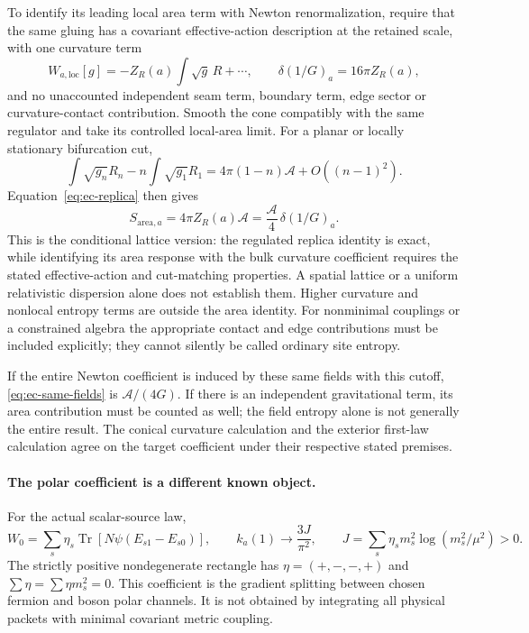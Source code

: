 \documentclass[10pt]{article}
\newcommand{\Tr}{\operatorname{Tr}}
\begin{document}
To identify its leading local area term with Newton renormalization,
require that the same gluing has a covariant effective-action
description at the retained scale, with one curvature term
\[
 W_{a,\mathrm{loc}}[g]=-Z_R(a)\int\sqrt g\,R+\cdots,
 \qquad \delta(1/G)_a=16\pi Z_R(a),
\]
and no unaccounted independent seam term, boundary term, edge sector
or curvature-contact contribution. Smooth the cone compatibly with
the same regulator and take its controlled local-area limit.
For a planar or locally stationary bifurcation cut,
\[
 \int\sqrt{g_n}R_n-n\int\sqrt{g_1}R_1
        =4\pi(1-n)\mathcal A+O((n-1)^2).
\]
Equation~\eqref{eq:ec-replica} then gives
\begin{equation}
 S_{\mathrm{area},a}=4\pi Z_R(a)\mathcal A
       =\frac{\mathcal A}{4}\,\delta(1/G)_a.
 \label{eq:ec-same-fields}
\end{equation}
This is the conditional lattice version: the regulated replica
identity is exact, while identifying its area response with the
bulk curvature coefficient requires the stated effective-action
and cut-matching properties. A spatial lattice or a uniform
relativistic dispersion alone does not establish them. Higher
curvature and nonlocal entropy terms are outside the area identity.
For nonminimal couplings or a constrained algebra the appropriate
contact and edge contributions must be included explicitly; they
cannot silently be called ordinary site entropy.

If the entire Newton coefficient is induced by these same fields
with this cutoff, \eqref{eq:ec-same-fields} is
$\mathcal A/(4G)$. If there is an independent gravitational term,
its area contribution must be counted as well; the field entropy
alone is not generally the entire result. The conical curvature
calculation and the exterior first-law calculation agree on the
target coefficient under their respective stated premises.

\paragraph{The polar coefficient is a different known object.}
For the actual scalar-source law,
\[
 W_0=\sum_s\eta_s\Tr[N\psi(E_{s1}-E_{s0})],\qquad
 k_a(1)\longrightarrow\frac{3J}{\pi^2},\qquad
 J=\sum_s\eta_sm_s^2\log(m_s^2/\mu^2)>0.
\]
The strictly positive nondegenerate rectangle has
$\eta=(+,-,-,+)$ and $\sum\eta=\sum\eta m_s^2=0$.
This coefficient is the gradient splitting between chosen fermion
and boson polar channels. It is not obtained by integrating all
physical packets with minimal covariant metric coupling.
\end{document}
